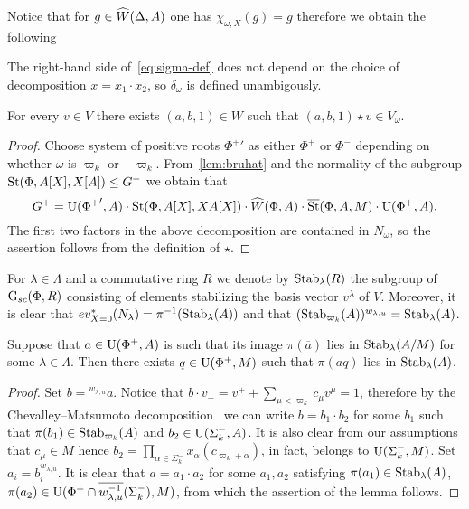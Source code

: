 Notice that for $g \in \widehat{W}(\Delta, A)$ one has $\chi_{\omega, X}(g) = g$ therefore we obtain the following
\begin{cor}
 The right-hand side of~\eqref{eq:sigma-def} does not depend on the choice of decomposition $x = x_1 \cdot x_2$, so $\delta_\omega$ is defined unambigously.
\end{cor}

\begin{lemma} \label{lem:v-correctness1}
 For every $v \in V$ there exists $(a, b, 1) \in W$ such that $(a, b, 1) \star v \in V_\omega$.
\end{lemma}
\begin{proof}
 Choose system of positive roots ${\Phi^+}'$ as either $\Phi^+$ or $\Phi^-$ depending on whether $\omega $ is $\varpi_k$ or $-\varpi_k$.
 From~\cref{lem:bruhat} and the normality of the subgroup $\operatorname{St}(\Phi, A[X], X[A]) \leq G^+$ we obtain that
  \[G^+ = \operatorname{U}({\Phi^+}', A)\cdot \operatorname{St}(\Phi, A[X], XA[X]) \cdot \widehat{W}(\Phi,A)\cdot \overline{\operatorname{St}}(\Phi, A, M) \cdot\operatorname{U}(\Phi^+, A).\]
 The first two factors in the above decomposition are contained in $N_\omega$, so the assertion follows from the definition of $\star$.
\end{proof}


For $\lambda \in \Lambda$ and a commutative ring $R$ we denote by $\operatorname{Stab}_{\lambda}(R)$ the subgroup of $\operatorname{G}_{sc}(\Phi, R)$
 consisting of elements stabilizing the basis vector $v^\lambda$ of $V$.
Moreover, it is clear that $ev_{X=0}^*(N_\lambda) = \pi^{-1}(\operatorname{Stab}_\lambda(A))$ and that
 $(\operatorname{Stab}_{\varpi_k}(A))^{w_{\lambda, u}} = \operatorname{Stab}_\lambda(A)$.
\begin{lemma} \label{lem:q}
Suppose that $a \in \operatorname{U}(\Phi^+, A)$ is such that its image $\pi(\overline{a})$ lies in $\operatorname{Stab}_{\lambda}(A/M)$ for some $\lambda \in \Lambda$.
Then there exists $q \in \operatorname{U}(\Phi^+, M)$ such that $\pi(aq)$ lies in $\operatorname{Stab}_{\lambda}(A)$.
\end{lemma}
\begin{proof}
    Set $b = {}^{w_{\lambda, u}} a$.
    Notice that $b \cdot v_+ = v^+ + \sum_{\mu < \varpi_k} c_\mu v^\mu = 1$, therefore by the Chevalley--Matsumoto decomposition~\cite[Theorem~1.3]{St78} we can write
     $b = b_1 \cdot b_2$ for some $b_1$ such that $\pi(b_1) \in \operatorname{Stab}_{\varpi_k}(A)$ and $b_2 \in \operatorname{U}(\Sigma_k^-, A)$.
    It is also clear from our assumptions that $c_\mu \in M$ hence $b_2 = \prod_{\alpha \in \Sigma_k^-}x_{\alpha}(c_{\varpi_k + \alpha})$, in fact, belongs to $\operatorname{U}(\Sigma_k^-, M)$.
    Set $a_i = b_i^{w_{\lambda, u}}$.
    It is clear that $a = a_1 \cdot a_2$  for some $a_1, a_2$ satisfying $\pi(a_1) \in \operatorname{Stab}_\lambda(A)$, $\pi(a_2) \in \operatorname{U}(\Phi^+ \cap \overline{w_{\lambda, u}^{-1}}(\Sigma_k^-), M)$,
     from which the assertion of the lemma follows.
\end{proof}

